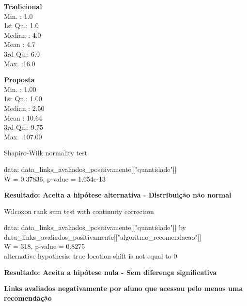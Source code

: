 \begin{multicols}{2}

\noindent\textbf{Tradicional}\\
Min.   : 1.0\\
1st Qu.: 1.0\\
Median : 4.0\\
Mean   : 4.7\\
3rd Qu.: 6.0\\
Max.   :16.0\\

\columnbreak

\noindent\textbf{Proposta}\\
Min.   :  1.00\\
1st Qu.:  1.00\\
Median :  2.50\\
Mean   : 10.64\\
3rd Qu.:  9.75\\
Max.   :107.00
\end{multicols}

  Shapiro-Wilk normality test

\noindent
data:  data\_links\_avaliados\_positivamente[["quantidade"]]\\
W = 0.37836, p-value = 1.654e-13

\textbf{Resultado: Aceita a hipótese alternativa - Distribuição não normal}

Wilcoxon rank sum test with continuity correction

\noindent
data:  data\_links\_avaliados\_positivamente[["quantidade"]] by \\
data\_links\_avaliados\_positivamente[["algoritmo\_recomendacao"]]\\
W = 318, p-value = 0.8275\\
alternative hypothesis: true location shift is not equal to 0

\textbf{Resultado: Aceita a hipótese nula - Sem diferença significativa}

\textbf{Links avaliados negativamente por aluno que acessou pelo menos uma recomendação}


